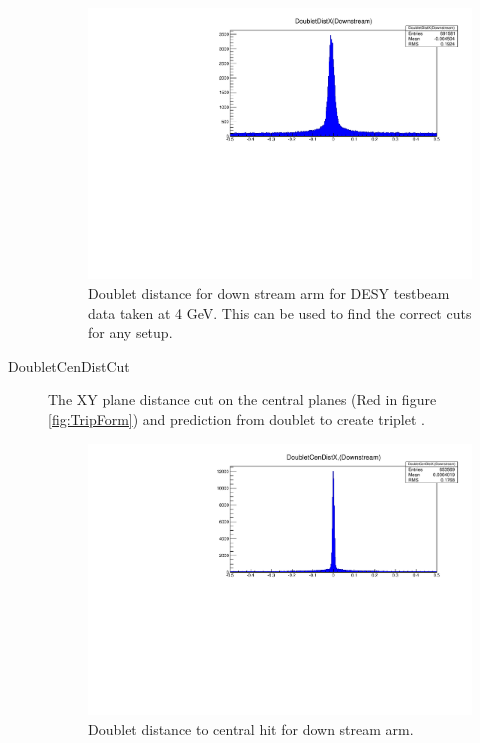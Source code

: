 \begin{description}
\begin{figure}[H]
\centering
\includegraphics[width=1.0\linewidth]{figures/DoubletDistX-442-preOnly.pdf}
\caption{Doublet distance for down stream arm for DESY testbeam data taken at 4 GeV. This can be used to find the correct cuts for any setup.}
\label{fig:DoubDis}
\end{figure}

\item[DoubletCenDistCut]  The XY plane distance cut on the central planes (Red in figure \ref{fig:TripForm}) and prediction from doublet to create triplet . 

\begin{figure}[H]
\centering
\includegraphics[width=1.0\linewidth]{figures/DoubletCenDist-442.pdf}
\caption{Doublet distance to central hit for down stream arm.}
\label{fig:DoubCen}
\end{figure}


\end{description}
